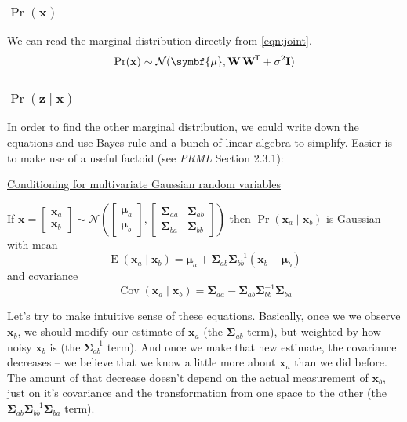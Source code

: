 \documentclass[11pt]{article}
\DeclareMathOperator{\E}{E}
\DeclareMathOperator{\Cov}{Cov}
\newcommand{\xb}{\mathbf{x}}
\newcommand{\zb}{\mathbf{z}}
\newcommand{\ub}{\symbf{\mu}}
\newcommand{\Sb}{\symbf{\Sigma}}
\newcommand{\Wb}{\mathbf{W}}
\newcommand*{\tran}{^{\mkern-1.5mu\mathsf{T}}}
\begin{document}
\subsubsection{$\Pr(\xb)$}
We can read the marginal distribution directly from \eqref{eqn:joint}.
\begin{equation}
  \Pr(\xb) \sim \mathcal{N}(\ub, \Wb\,
      \Wb\tran + \sigma^2\mathbf{I})
  \label{eqn:marginalX}
\end{equation}

\subsubsection{$\Pr(\zb \mid \xb)$}
In order to find the other marginal distribution, we could write down the
equations and use Bayes rule and a bunch of linear algebra to simplify.
Easier is to make use of a useful factoid (see \textit{PRML} Section 2.3.1):
\begin{framed}
  \underline{Conditioning for multivariate Gaussian random variables}

  If $\xb = \begin{bmatrix}\xb_a \\ \xb_b\end{bmatrix} \sim
  \mathcal{N}\left( \begin{bmatrix} \ub_a \\ \ub_b \end{bmatrix},
    \begin{bmatrix}\Sb_{aa} & \Sb_{ab} \\
                   \Sb_{ba} & \Sb_{bb} \end{bmatrix}
  \right)$ then $\Pr(\xb_a \mid \xb_b)$ is Gaussian with mean
  \begin{equation*}
    \E(\xb_a \mid \xb_b) = \ub_a + \Sb_{ab} \Sb_{bb}^{-1} (\xb_b-\ub_b)
  \end{equation*}
  and covariance
  \begin{equation*}
    \Cov(\xb_a \mid \xb_b) = \Sb_{aa} - \Sb_{ab} \Sb_{bb}^{-1} \Sb_{ba}
  \end{equation*}

  Let's try to make intuitive sense of these equations. Basically, once we
  we observe $\xb_b$, we should modify our estimate of $\xb_a$ (the
  $\Sb_{ab}$ term), but weighted by how noisy $\xb_b$ is (the
  $\Sb_{ab}^{-1}$ term). And once we make that new estimate, the covariance
  decreases -- we believe that we know a little more about $\xb_a$ than we did
  before. The amount of that decrease doesn't depend on the actual measurement
  of $\xb_b$, just on it's covariance and the transformation from one space to
  the other (the $\Sb_{ab} \Sb_{bb}^{-1} \Sb_{ba}$ term).
\end{framed}
\end{document}
